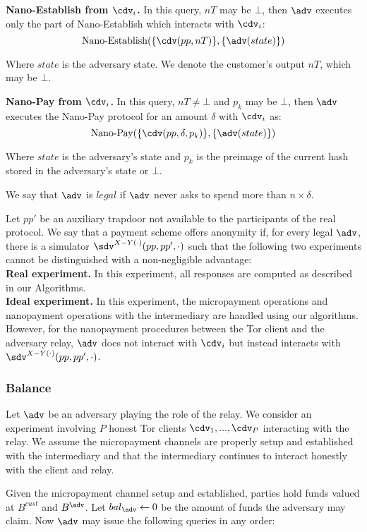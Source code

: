 \textbf{Nano-Establish from $\cdv_i$.}
In this query, $nT$ may be $\bot$, then $\adv$ executes only the part of Nano-Establish which interacts with $\cdv_i$: $$\operatorname{Nano-Establish}(\{\cdv(pp, nT)\}, \{\adv(state)\})$$

Where $state$ is the adversary state.
We denote the customer's output $nT$, which may be $\bot$.

\textbf{Nano-Pay from $\cdv_i$.}
In this query, $nT \neq \bot$ and $p_k$ may be $\bot$, then $\adv$ executes the Nano-Pay protocol for an amount $\delta$ with $\cdv_i$ as: $$\operatorname{Nano-Pay}(\{\cdv(pp, \delta, p_k)\}, \{\adv(state)\})$$

Where $state$ is the adversary's state and $p_k$ is the preimage of the current hash stored in the adversary's state or $\bot$.

We say that $\adv$ is $legal$ if $\adv$ never asks to spend more than $n \times \delta$.

Let $pp'$ be an auxiliary trapdoor not available to the participants of the real protocol.
We say that a payment scheme offers anonymity if, for every legal $\adv$, there is a simulator $\sdv^{X-Y(\cdot)}(pp, pp', \cdot)$ such that the following two experiments cannot be distinguished with a non-negligible advantage:\\

\textbf{Real experiment.}
In this experiment, all responses are computed as described in our Algorithms.\\

\textbf{Ideal experiment.}
In this experiment, the micropayment operations and nanopayment operations with the intermediary are handled using our algorithms.
However, for the nanopayment procedures between the Tor client and the adversary relay, $\adv$ does not interact with $\cdv_i$ but instead interacts with $\sdv^{X-Y(\cdot)}(pp,pp',\cdot)$.

\subsubsection{Balance}
\label{def:balance}

Let $\adv$ be an adversary playing the role of the relay.
We consider an experiment involving $P$ honest Tor clients $\cdv_1,..., \cdv_P$ interacting with the relay.
We assume the micropayment channels are properly setup and established with the intermediary and that the intermediary continues to interact honestly with the client and relay.

Given the micropayment channel setup and established, parties hold funds valued at $B^{cust}$ and $B^{\adv}$.
Let $bal_\adv \leftarrow 0$ be the amount of funds the adversary may claim.
Now $\adv$ may issue the following queries in any order:\\

